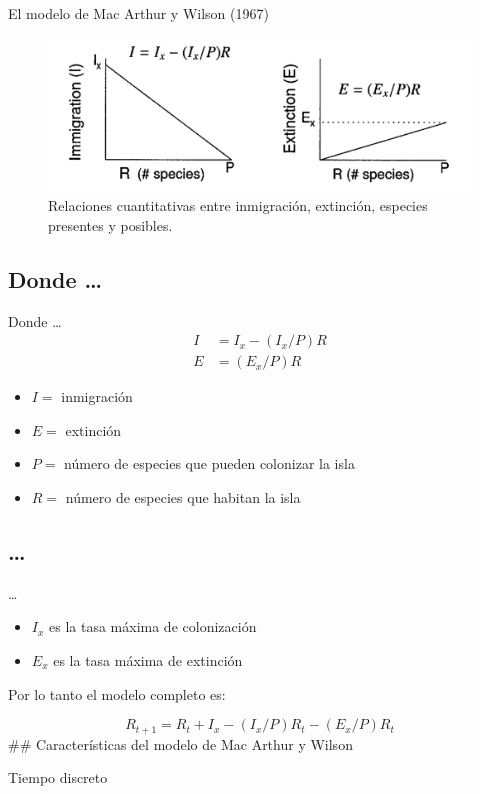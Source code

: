 \documentclass[
  11pt,
  ignorenonframetext,
]{beamer}
\begin{document}
\begin{frame}{El modelo de Mac Arthur y Wilson (1967)}
\begin{figure}

{\centering \includegraphics[width=4.73in]{Biogeografia/MacArthur} 

}

\caption{Relaciones cuantitativas entre inmigración, extinción, especies presentes y posibles.}\label{fig:unnamed-chunk-2}
\end{figure}
\end{frame}

\hypertarget{donde}{%
\subsection{Donde \ldots{}}\label{donde}}

\begin{frame}{Donde \ldots{}}
\begin{align}
I &= I_x - (I_x/P)R \\
E &= (E_x/P)R
\end{align}

\begin{itemize}
\item
  \(I =\) inmigración
\item
  \(E =\) extinción
\item
  \(P =\) número de especies que pueden colonizar la isla
\item
  \(R =\) número de especies que habitan la isla
\end{itemize}
\end{frame}

\hypertarget{section}{%
\subsection{\ldots{}}\label{section}}

\begin{frame}{\ldots{}}
\begin{itemize}
\item
  \(I_x\) es la tasa máxima de colonización
\item
  \(E_x\) es la tasa máxima de extinción
\end{itemize}

Por lo tanto el modelo completo es:

\[R_{t+1} = R_t + I_x - (I_x/P)R_t - (E_x/P)R_t\] \#\# Características
del modelo de Mac Arthur y Wilson

Tiempo discreto
\end{frame}
\end{document}
